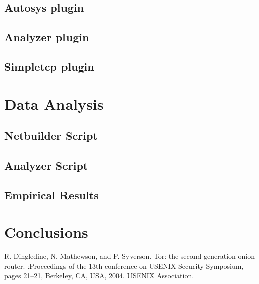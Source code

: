 \documentclass[a4paper]{article}
\begin{document}
\subsection{Autosys plugin}
\subsection{Analyzer plugin}
\subsection{Simpletcp plugin}

\section{Data Analysis}
\subsection{Netbuilder Script}
\subsection{Analyzer Script}
\subsection{Empirical Results}

\section{Conclusions}

\begin{thebibliography}{50}
		R. Dingledine, N. Mathewson, and P. Syverson. 
		Tor: the second-generation onion router. 
		\textsl:{Proceedings of the 13th conference on USENIX Security Symposium}, 
		pages 21–21, Berkeley, CA, USA, 2004.
		USENIX Association.
\end{thebibliography}
\end{document}
